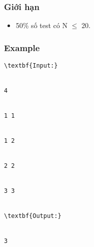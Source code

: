\subsubsection{   Giới hạn  }
\begin{itemize}
	\item     50\% số test có N  $\le$  20.   
\end{itemize}

\subsubsection{   Example  }
\begin{verbatim}
\textbf{Input:}


4


1 1


1 2


2 2


3 3


\textbf{Output:}


3\end{verbatim}
